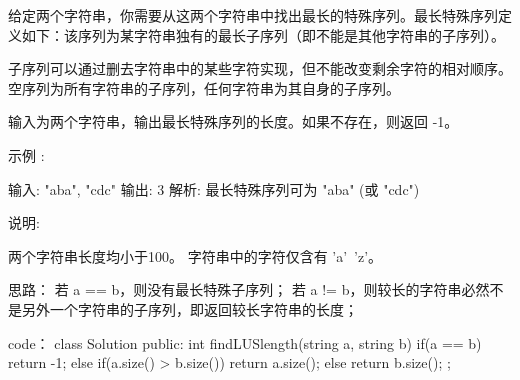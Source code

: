给定两个字符串，你需要从这两个字符串中找出最长的特殊序列。最长特殊序列定义如下：该序列为某字符串独有的最长子序列（即不能是其他字符串的子序列）。

子序列可以通过删去字符串中的某些字符实现，但不能改变剩余字符的相对顺序。空序列为所有字符串的子序列，任何字符串为其自身的子序列。

输入为两个字符串，输出最长特殊序列的长度。如果不存在，则返回 -1。

示例 :

输入: "aba", "cdc"
输出: 3
解析: 最长特殊序列可为 "aba" (或 "cdc")

说明:

    两个字符串长度均小于100。
    字符串中的字符仅含有 'a'~'z'。



















思路：
若 a == b，则没有最长特殊子序列；
若 a != b，则较长的字符串必然不是另外一个字符串的子序列，即返回较长字符串的长度；





















code：
class Solution {
public:
    int findLUSlength(string a, string b) {
        if(a == b) return -1;
        else
        {
            if(a.size() > b.size()) return a.size();
            else return b.size();
        }
    }
};